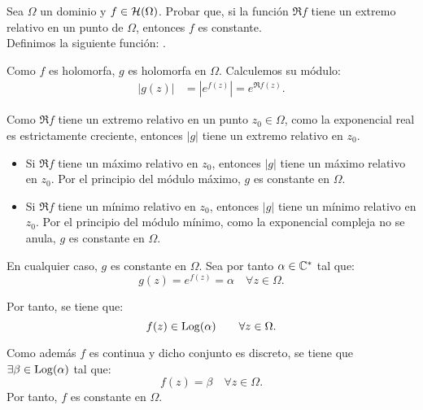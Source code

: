 \begin{ejercicio}
    Sea $\Omega$ un dominio y $f\in \mathcal{H}(\Omega)$. Probar que, si la función $\Re f$ tiene un extremo relativo en un punto de $\Omega$, entonces $f$ es constante.\\

    Definimos la siguiente función:
    .

    Como $f$ es holomorfa, $g$ es holomorfa en $\Omega$. Calculemos su módulo:
    \begin{align*}
        |g(z)| &= |e^{f(z)}| = e^{\Re f(z)}.
    \end{align*}

    Como $\Re f$ tiene un extremo relativo en un punto $z_0\in \Omega$, como la exponencial real es estrictamente creciente, entonces $|g|$ tiene un extremo relativo en $z_0$.
    \begin{itemize}
        \item Si $\Re f$ tiene un máximo relativo en $z_0$, entonces $|g|$ tiene un máximo relativo en $z_0$. Por el principio del módulo máximo, $g$ es constante en $\Omega$.
        \item Si $\Re f$ tiene un mínimo relativo en $z_0$, entonces $|g|$ tiene un mínimo relativo en $z_0$. Por el principio del módulo mínimo, como la exponencial compleja no se anula, $g$ es constante en $\Omega$.
    \end{itemize}

    En cualquier caso, $g$ es constante en $\Omega$. Sea por tanto $\alpha\in \mathbb{C}^*$ tal que:
    \begin{equation*}
        g(z) = e^{f(z)} = \alpha \quad \forall z\in \Omega.
    \end{equation*}

    Por tanto, se tiene que:
    \begin{equation*}
        f(z) \in \operatorname{Log}(\alpha)\qquad \forall z\in \Omega.
    \end{equation*}

    Como además $f$ es continua y dicho conjunto es discreto, se tiene que $\exists \beta\in \operatorname{Log}(\alpha)$ tal que:
    \begin{equation*}
        f(z) = \beta \quad \forall z\in \Omega.
    \end{equation*}
    Por tanto, $f$ es constante en $\Omega$.
\end{ejercicio}

